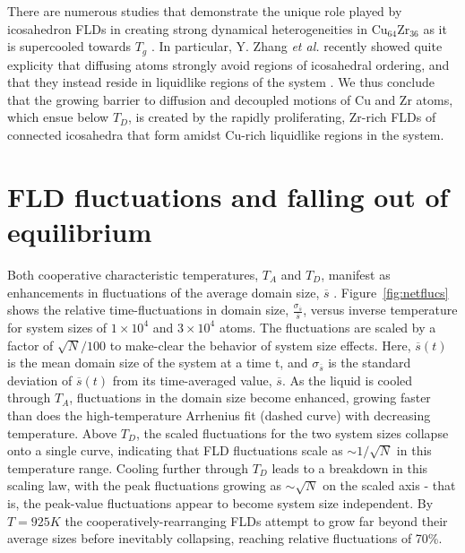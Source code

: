 \documentclass[aps,prl,preprint,showpacs,amsmath,floatfix,superscriptaddress]{revtex4}
\begin{document}
There are numerous studies that demonstrate the unique role played
by icosahedron FLDs in creating strong dynamical heterogeneities
in Cu$_{64}$Zr$_{36}$ as it is supercooled towards $T_{g}$
\cite{Cheng2008,Ding2014,Mendelev2015}. In particular, Y. Zhang
\textit{et al.} recently showed quite explicity that diffusing
atoms strongly avoid regions of icosahedral ordering, and that
they instead reside in liquidlike regions of the system
\cite{Mendelev2015}. We thus conclude that the growing barrier to
diffusion and decoupled motions of Cu and Zr atoms, which ensue
below $T_{D}$, is created by the rapidly proliferating, Zr-rich
FLDs of connected icosahedra that form amidst Cu-rich liquidlike
regions in the system.

\section{FLD fluctuations and falling out of equilibrium}

Both cooperative characteristic temperatures, $T_{A}$ and $T_{D}$,
manifest as enhancements in fluctuations of the average domain
size, $\overline{s}$ . Figure~\ref{fig:netflucs} shows the
relative time-fluctuations in domain size,
$\frac{\sigma_{\overline{s}}}{\overline{s}}$, versus inverse
temperature for system sizes of $1\times 10^{4}$ and $3\times
10^{4}$ atoms. The fluctuations are scaled by a factor of
$\sqrt{N}/100$ to make-clear the behavior of system size effects.
Here, $\overline{s}(t)$ is the mean domain size of the system at a
time t, and $\sigma_{\overline{s}}$ is the standard deviation of
$\overline{s}(t)$ from its time-averaged value, $\overline{s}$. As
the liquid is cooled through $T_{A}$, fluctuations in the domain
size become enhanced, growing faster than does the
high-temperature Arrhenius fit (dashed curve) with decreasing
temperature. Above $T_{D}$, the scaled fluctuations for the two
system sizes collapse onto a single curve, indicating that FLD
fluctuations scale as $\sim1/\sqrt{N}$ in this temperature range.
Cooling further through $T_{D}$ leads to a breakdown in this
scaling law, with the peak fluctuations growing as $\sim\sqrt{N}$
on the scaled axis - that is, the peak-value fluctuations appear
to become system size independent. By $T=925K$ the
cooperatively-rearranging FLDs attempt to grow far beyond their
average sizes before inevitably collapsing, reaching relative
fluctuations of 70\%.
\end{document}
